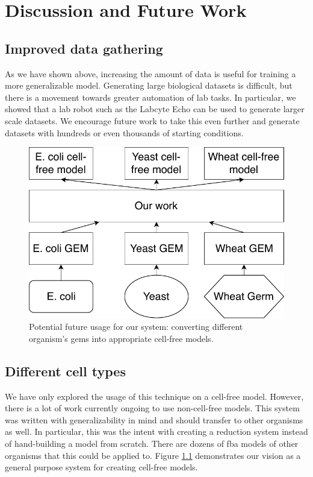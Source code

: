 \chapter{Discussion and Future Work} 


\section{Improved data gathering}
As we have shown above, increasing the amount of data is useful for training a more generalizable model.
Generating large biological datasets is difficult, but there is a movement towards greater automation of lab tasks.
In particular, we showed that a lab robot such as the Labcyte Echo can be used to generate larger scale datasets.
We encourage future work to take this even further and generate datasets with hundreds or even thousands of starting conditions.

\begin{figure}[t!]
\begin{center}
\includegraphics{figs/Vision.pdf}
\caption{Potential future usage for our system: converting different organism's \glspl{gem} into appropriate cell-free models.}
\end{center}
\label{fig:vision}
\end{figure}

\section{Different cell types}
We have only explored the usage of this technique on a \ecoli cell-free model.
However, there is a lot of work currently ongoing to use non-\ecoli cell-free models.
This system was written with generalizability in mind and should transfer to other organisms as well.
In particular, this was the intent with creating a reduction system instead of hand-building a model from scratch.
There are dozens of \gls{fba} models of other organisms that this could be applied to.
Figure \ref{fig:vision} demonstrates our vision as a general purpose system for creating cell-free models.

